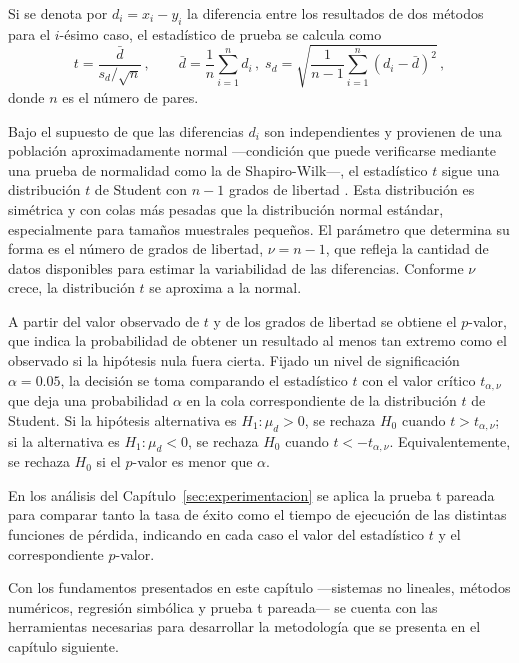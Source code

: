 \documentclass{article}
\begin{document}
Si se denota por \(d_i = x_i - y_i\) la diferencia entre los resultados
de dos métodos para el \(i\)-ésimo caso, el estadístico de prueba se
calcula como
\[
t = \frac{\bar{d}}{s_d / \sqrt{n}}\,,
\qquad
\bar{d} = \frac{1}{n}\sum_{i=1}^{n} d_i\,,\;
s_d = \sqrt{\frac{1}{n-1}\sum_{i=1}^{n} (d_i - \bar{d})^2}\,,
\]
donde \(n\) es el número de pares.

Bajo el supuesto de que las diferencias \(d_i\) son independientes y
provienen de una población aproximadamente normal —condición que puede
verificarse mediante una prueba de normalidad como la de
Shapiro-Wilk—, el estadístico \(t\) sigue una distribución \(t\) de
Student con \(n-1\) grados de libertad \cite{montgomery2017applied}.
Esta distribución es simétrica y con colas más pesadas que la
distribución normal estándar, especialmente para tamaños muestrales
pequeños. El parámetro que determina su forma es el número de grados
de libertad, \(\nu = n-1\), que refleja la cantidad de datos
disponibles para estimar la variabilidad de las diferencias. Conforme
\(\nu\) crece, la distribución \(t\) se aproxima a la normal.

A partir del valor observado de \(t\) y de los grados de libertad se
obtiene el \(p\)-valor, que indica la probabilidad de obtener un
resultado al menos tan extremo como el observado si la hipótesis nula
fuera cierta. Fijado un nivel de significación \(\alpha = 0.05\), la
decisión se toma comparando el estadístico \(t\) con el valor crítico
\(t_{\alpha, \nu}\) que deja una probabilidad \(\alpha\) en la cola
correspondiente de la distribución \(t\) de Student. Si la hipótesis
alternativa es \(H_1 : \mu_d > 0\), se rechaza \(H_0\) cuando
\(t > t_{\alpha, \nu}\); si la alternativa es \(H_1 : \mu_d < 0\), se
rechaza \(H_0\) cuando \(t < -t_{\alpha, \nu}\). Equivalentemente, se
rechaza \(H_0\) si el \(p\)-valor es menor que \(\alpha\).

En los análisis del Capítulo~\ref{sec:experimentacion} se aplica la
prueba t pareada para comparar tanto la tasa de éxito como el tiempo de
ejecución de las distintas funciones de pérdida, indicando en cada caso
el valor del estadístico \(t\) y el correspondiente \(p\)-valor.

Con los fundamentos presentados en este capítulo —sistemas no lineales,
métodos numéricos, regresión simbólica y prueba t pareada— se cuenta
con las herramientas necesarias para desarrollar la metodología que se
presenta en el capítulo siguiente.

\newpage   
\end{document}

